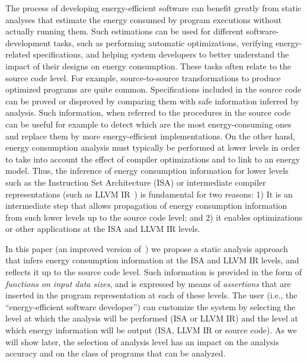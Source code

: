 \documentclass{llncs}
\newcommand{\level}{level\xspace}
\newcommand{\levels}{levels\xspace}
\newcommand{\llvmir}{LLVM IR\xspace}
\begin{document}
The process of developing energy-efficient software can benefit
greatly from static analyses that estimate the energy consumed by
program executions without actually running them.  Such estimations
can be used for different software-development tasks, such as
performing automatic optimizations, verifying energy-related
specifications, and helping system developers to better understand the
impact of their designs on energy consumption. These tasks often
relate to the source code \level.
For example, source-to-source transformations to produce optimized
programs are quite common. Specifications included in the source code
can be proved or disproved by comparing them with safe information
inferred by analysis. Such information, when referred to the
procedures in the source code can be useful for example to detect
which are the most energy-consuming ones and replace them by more
energy-efficient implementations.
On the other hand, energy consumption analysis must typically be
performed at lower levels in order to take into account the effect of
compiler optimizations and to link to an energy model. Thus, the inference of energy consumption
information for lower \levels such as the Instruction Set Architecture
(ISA) or intermediate compiler representations (such as
\llvmir~\cite{LattnerLLVM2004}) is fundamental for two reasons:
1) It is an intermediate step that allows propagation of energy
consumption information from such lower \levels up to the source code
\level;
and 2) it enables optimizations or other applications at the ISA and
\llvmir \levels.  

In this paper (an improved version
of~\cite{entra-d3.2.4-isa-vs-llvm-short}) we propose a static analysis
approach
that infers energy consumption information at the ISA and \llvmir
\levels, and reflects it up to the source code \level.  Such information
is provided in the form of \emph{functions on input data sizes}, and
is expressed by means of \emph{assertions} that are inserted in the
program representation at each of these \levels.
The user (i.e., the ``energy-efficient software developer'') can
customize the system by selecting the \level at which the analysis
will be performed (ISA or \llvmir) and the \level at which energy
information will be output (ISA, \llvmir or source code).
As we will show later, the selection of analysis level has an impact
on the analysis accuracy and on the class of programs that can be
analyzed.
\end{document}
